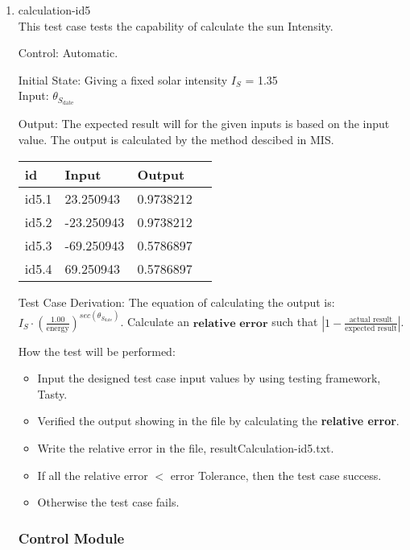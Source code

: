 \documentclass[12pt, titlepage]{article}
\begin{document}
\begin{enumerate}
\item{calculation-id5\\} 
This test case tests the capability of calculate the sun Intensity.

Control: Automatic. 

Initial State: Giving a fixed solar intensity $I_{S}$  =  1.35 \\
Input: $\theta_{S_{\text{date}}}$ 


Output: The expected result will for the given inputs is based on the input value.
The output is calculated by the method descibed in MIS. 

\noindent \begin{tabular}{l l l l} 
    \toprule		
    \textbf{id} & \textbf{Input} & \textbf{Output}\\ 
	\midrule
   id5.1 &  23.250943  & 0.9738212\\
   id5.2 & -23.250943  & 0.9738212\\
   id5.3 & -69.250943  & 0.5786897\\
   id5.4 &  69.250943  & 0.5786897\\
    \bottomrule
  \end{tabular}

Test Case Derivation: The equation of calculating the output is:\\
$I_{S} \cdot (\frac{1.00}{\text{energy}})^{sec(\theta_{S_{\text{date}}})} $. Calculate an $\textbf{relative error}$ such that $| 1 - \frac{\text{actual result}}{ \text{expected result}} |$.


How the test will be performed:

\begin{itemize} 
\item Input the designed test case input values by using testing framework, Tasty. 
\item Verified the output showing in the file by calculating the \textbf{relative error}.
\item Write the relative error in the file, resultCalculation-id5.txt.
\item If all the relative error $<$ error Tolerance, then the test case success.
\item Otherwise the test case fails.
\end{itemize}

\subsubsection{Control Module} 


\end{enumerate}
\end{document}
